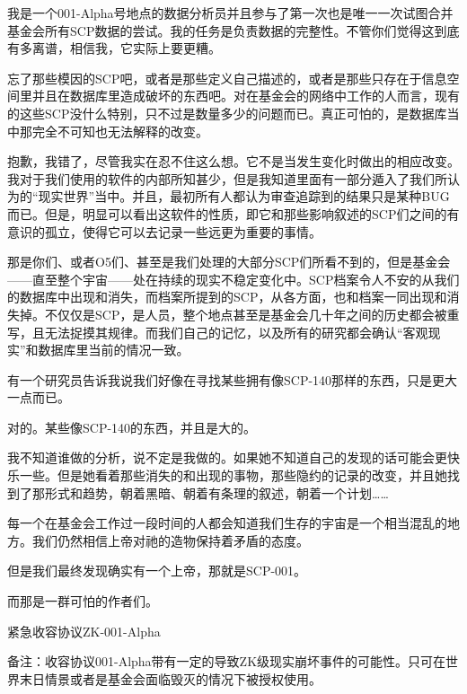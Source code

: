 \begin{scpbox}
我是一个001-Alpha号地点的数据分析员并且参与了第一次也是唯一一次试图合并基金会所有SCP数据的尝试。我的任务是负责数据的完整性。不管你们觉得这到底有多离谱，相信我，它实际上要更糟。

忘了那些模因的SCP吧，或者是那些定义自己描述的，或者是那些只存在于信息空间里并且在数据库里造成破坏的东西吧。对在基金会的网络中工作的人而言，现有的这些SCP没什么特别，只不过是数量多少的问题而已。真正可怕的，是数据库当中那完全不可知也无法解释的改变。

抱歉，我错了，尽管我实在忍不住这么想。它不是当发生变化时做出的相应改变。我对于我们使用的软件的内部所知甚少，但是我知道里面有一部分遁入了我们所认为的“现实世界”当中。并且，最初所有人都认为审查追踪到的结果只是某种BUG而已。但是，明显可以看出这软件的性质，即它和那些影响叙述的SCP们之间的有意识的孤立，使得它可以去记录一些远更为重要的事情。

那是你们、或者O5们、甚至是我们处理的大部分SCP们所看不到的，但是基金会——直至整个宇宙——处在持续的现实不稳定变化中。SCP档案令人不安的从我们的数据库中出现和消失，而档案所提到的SCP，从各方面，也和档案一同出现和消失掉。不仅仅是SCP，是人员，整个地点甚至是基金会几十年之间的历史都会被重写，且无法捉摸其规律。而我们自己的记忆，以及所有的研究都会确认“客观现实”和数据库里当前的情况一致。

有一个研究员告诉我说我们好像在寻找某些拥有像SCP-140那样的东西，只是更大一点而已。

对的。某些像SCP-140的东西，并且是大的。

我不知道谁做的分析，说不定是我做的。如果她不知道自己的发现的话可能会更快乐一些。但是她看着那些消失的和出现的事物，那些隐约的记录的改变，并且她找到了那形式和趋势，朝着黑暗、朝着有条理的叙述，朝着一个计划……

每一个在基金会工作过一段时间的人都会知道我们生存的宇宙是一个相当混乱的地方。我们仍然相信上帝对祂的造物保持着矛盾的态度。

但是我们最终发现确实有一个上帝，那就是SCP-001。

而那是一群可怕的作者们。

\end{scpbox}

紧急收容协议ZK-001-Alpha 



备注：收容协议001-Alpha带有一定的导致ZK级现实崩坏事件的可能性。只可在世界末日情景或者是基金会面临毁灭的情况下被授权使用。

